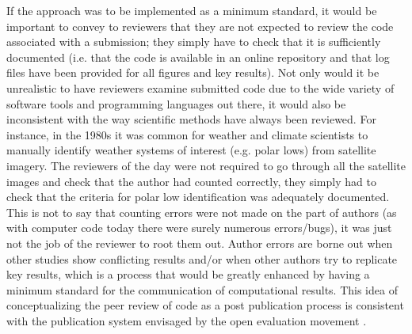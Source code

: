 If the \citet{Irving2016} approach was to be implemented as a minimum standard, it would be important to convey to reviewers that they are not expected to review the code associated with a submission; they simply have to check that it is sufficiently documented (i.e. that the code is available in an online repository and that log files have been provided for all figures and key results). Not only would it be unrealistic to have reviewers examine submitted code due to the wide variety of software tools and programming languages out there, it would also be inconsistent with the way scientific methods have always been reviewed. For instance, in the 1980s it was common for weather and climate scientists to manually identify weather systems of interest (e.g. polar lows) from satellite imagery. The reviewers of the day were not required to go through all the satellite images and check that the author had counted correctly, they simply had to check that the criteria for polar low identification was adequately documented. This is not to say that counting errors were not made on the part of authors (as with computer code today there were surely numerous errors/bugs), it was just not the job of the reviewer to root them out. Author errors are borne out when other studies show conflicting results and/or when other authors try to replicate key results, which is a process that would be greatly enhanced by having a minimum standard for the communication of computational results. This idea of conceptualizing the peer review of code as a post publication process is consistent with the publication system envisaged by the open evaluation movement \citep[e.g.][]{Kriegeskorte2012}. 